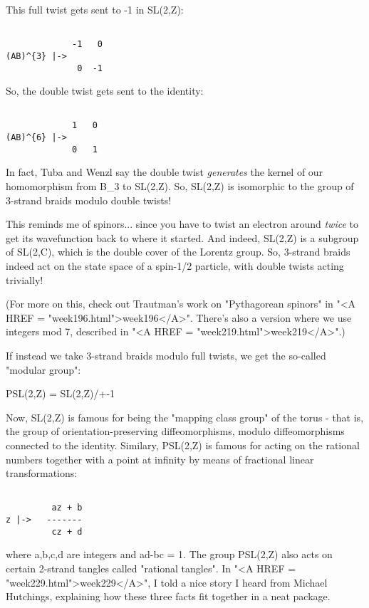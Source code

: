 This full twist gets sent to -1 in SL(2,Z):


\begin{verbatim}

             -1   0 
(AB)^{3} |->  
              0  -1
\end{verbatim}
    
So, the double twist gets sent to the identity:


\begin{verbatim}

             1   0 
(AB)^{6} |->  
             0   1
\end{verbatim}
    
In fact, Tuba and Wenzl say the double twist \emph{generates} the
kernel of our homomorphism from B_{3} to SL(2,Z).  So, SL(2,Z)
is isomorphic to the group of 3-strand braids modulo double twists!

This reminds me of spinors... since you have to twist an electron 
around \emph{twice} to get its wavefunction back to where it started.   
And indeed, SL(2,Z) is a subgroup of SL(2,C), which is the double 
cover of the Lorentz group.  So, 3-strand braids indeed act on the 
state space of a spin-1/2 particle, with double twists acting 
trivially!

(For more on this, check out Trautman's work on "Pythagorean
spinors" in "<A HREF = "week196.html">week196</A>".
There's also a version where we use integers mod 7, described in
"<A HREF = "week219.html">week219</A>".)

If instead we take 3-strand braids modulo full twists, we get the 
so-called "modular group":

PSL(2,Z) = SL(2,Z)/{+-1}

Now, SL(2,Z) is famous for being the "mapping class group"
of the torus - that is, the group of orientation-preserving
diffeomorphisms, modulo diffeomorphisms connected to the identity.
Similary, PSL(2,Z) is famous for acting on the rational numbers
together with a point at infinity by means of fractional linear
transformations:


\begin{verbatim}

         az + b
z |->   -------
         cz + d
\end{verbatim}
    

where a,b,c,d are integers and ad-bc = 1.  The group PSL(2,Z) also
acts on certain 2-strand tangles called "rational tangles".
In "<A HREF = "week229.html">week229</A>", I told a nice
story I heard from Michael Hutchings, explaining how these three facts
fit together in a neat package.
 

